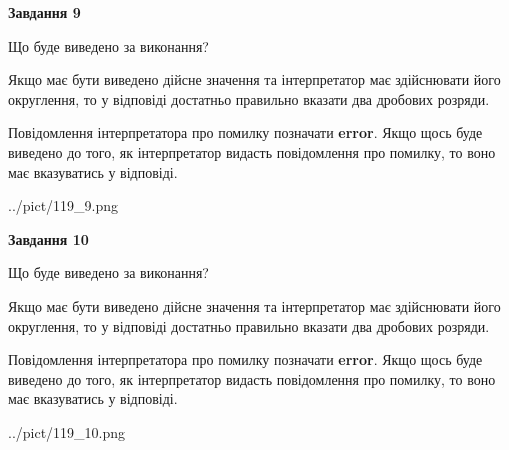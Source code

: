 \documentclass[12pt, ukrainian]{article}
\begin{document}
{\begin {Large}
{\begin {center}\textbf{Завдання 9}\end {center}}\par
Що буде виведено за виконання? \par

Якщо має бути виведено дійсне значення та інтерпретатор має здійснювати його округлення, 
то у відповіді достатньо правильно вказати два дробових розряди.

Повідомлення інтерпретатора про помилку позначати \textbf{error}.
Якщо щось буде виведено до того, як інтерпретатор видасть повідомлення про помилку, 
то воно має вказуватись у відповіді. \par

\begin{center}
	{../pict/119_9.png}
\end{center}
\newpage

{\begin {center}\textbf{Завдання 10}\end {center}}\par
Що буде виведено за виконання? \par

Якщо має бути виведено дійсне значення та інтерпретатор має здійснювати його округлення, 
то у відповіді достатньо правильно вказати два дробових розряди.

Повідомлення інтерпретатора про помилку позначати \textbf{error}.
Якщо щось буде виведено до того, як інтерпретатор видасть повідомлення про помилку, 
то воно має вказуватись у відповіді. \par

\begin{center}
	{../pict/119_10.png}
\end{center}
\newpage

\end {Large}}
\end{document}
